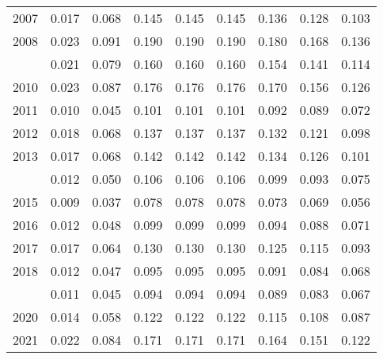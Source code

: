 \documentclass[
]{article}
\begin{document}
\begin{longtable}[t]{lrrrrrrrr}
2007 & 0.017 & 0.068 & 0.145 & 0.145 & 0.145 & 0.136 & 0.128 & 0.103\\
2008 & 0.023 & 0.091 & 0.190 & 0.190 & 0.190 & 0.180 & 0.168 & 0.136\\
\addlinespace
2009 & 0.021 & 0.079 & 0.160 & 0.160 & 0.160 & 0.154 & 0.141 & 0.114\\
2010 & 0.023 & 0.087 & 0.176 & 0.176 & 0.176 & 0.170 & 0.156 & 0.126\\
2011 & 0.010 & 0.045 & 0.101 & 0.101 & 0.101 & 0.092 & 0.089 & 0.072\\
2012 & 0.018 & 0.068 & 0.137 & 0.137 & 0.137 & 0.132 & 0.121 & 0.098\\
2013 & 0.017 & 0.068 & 0.142 & 0.142 & 0.142 & 0.134 & 0.126 & 0.101\\
\addlinespace
2014 & 0.012 & 0.050 & 0.106 & 0.106 & 0.106 & 0.099 & 0.093 & 0.075\\
2015 & 0.009 & 0.037 & 0.078 & 0.078 & 0.078 & 0.073 & 0.069 & 0.056\\
2016 & 0.012 & 0.048 & 0.099 & 0.099 & 0.099 & 0.094 & 0.088 & 0.071\\
2017 & 0.017 & 0.064 & 0.130 & 0.130 & 0.130 & 0.125 & 0.115 & 0.093\\
2018 & 0.012 & 0.047 & 0.095 & 0.095 & 0.095 & 0.091 & 0.084 & 0.068\\
\addlinespace
2019 & 0.011 & 0.045 & 0.094 & 0.094 & 0.094 & 0.089 & 0.083 & 0.067\\
2020 & 0.014 & 0.058 & 0.122 & 0.122 & 0.122 & 0.115 & 0.108 & 0.087\\
2021 & 0.022 & 0.084 & 0.171 & 0.171 & 0.171 & 0.164 & 0.151 & 0.122\\*
\end{longtable}
\end{document}
